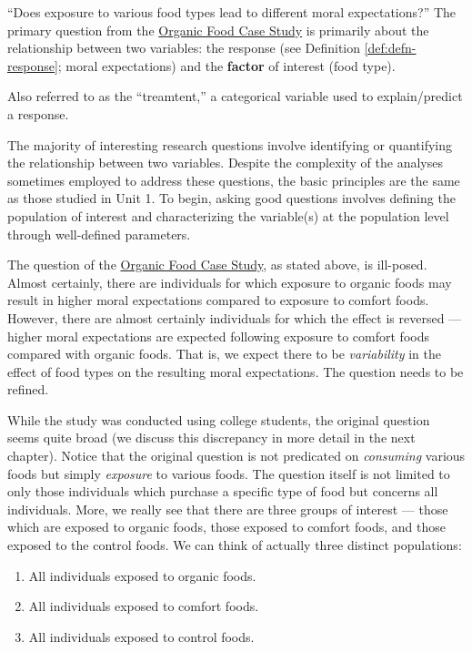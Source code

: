 \documentclass[]{book}
\providecommand{\tightlist}{%
  \setlength{\itemsep}{0pt}\setlength{\parskip}{0pt}}
\theoremstyle{definition}
\theoremstyle{definition}
\theoremstyle{remark}
\let\BeginKnitrBlock\begin \let\EndKnitrBlock\end
\begin{document}
``Does exposure to various food types lead to different moral
expectations?'' The primary question from the
\protect\hyperlink{CaseOrganic}{Organic Food Case Study} is primarily
about the relationship between two variables: the response (see
Definition \ref{def:defn-response}; moral expectations) and the
\textbf{factor} of interest (food type).

\BeginKnitrBlock{definition}[Factor]
\protect\hypertarget{def:defn-factor}{}{\label{def:defn-factor}
{} }Also referred to as the ``treamtent,'' a
categorical variable used to explain/predict a response.
\EndKnitrBlock{definition}

The majority of interesting research questions involve identifying or
quantifying the relationship between two variables. Despite the
complexity of the analyses sometimes employed to address these
questions, the basic principles are the same as those studied in Unit 1.
To begin, asking good questions involves defining the population of
interest and characterizing the variable(s) at the population level
through well-defined parameters.

The question of the \protect\hyperlink{CaseOrganic}{Organic Food Case
Study}, as stated above, is ill-posed. Almost certainly, there are
individuals for which exposure to organic foods may result in higher
moral expectations compared to exposure to comfort foods. However, there
are almost certainly individuals for which the effect is reversed ---
higher moral expectations are expected following exposure to comfort
foods compared with organic foods. That is, we expect there to be
\emph{variability} in the effect of food types on the resulting moral
expectations. The question needs to be refined.

While the study was conducted using college students, the original
question seems quite broad (we discuss this discrepancy in more detail
in the next chapter). Notice that the original question is not
predicated on \emph{consuming} various foods but simply \emph{exposure}
to various foods. The question itself is not limited to only those
individuals which purchase a specific type of food but concerns all
individuals. More, we really see that there are three groups of interest
--- those which are exposed to organic foods, those exposed to comfort
foods, and those exposed to the control foods. We can think of actually
three distinct populations:

\begin{enumerate}
\def\labelenumi{\arabic{enumi}.}
\tightlist
\item
  All individuals exposed to organic foods.
\item
  All individuals exposed to comfort foods.
\item
  All individuals exposed to control foods.
\end{enumerate}
\end{document}
